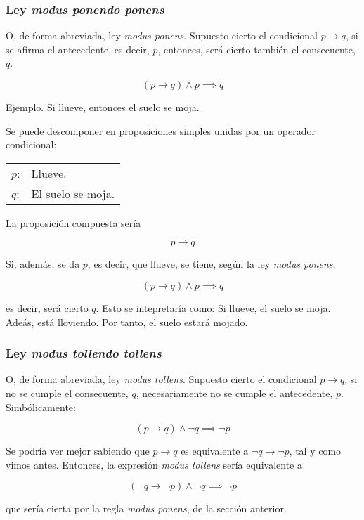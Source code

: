 \subsubsection{Ley \emph{modus ponendo ponens}}

O, de forma abreviada, ley \emph{modus ponens}. Supuesto cierto el
condicional $p \to q$, si se afirma el antecedente, es decir, $p$, entonces,
será cierto también el consecuente, $q$.

$$ (p \to q) \land p \implies q $$

Ejemplo. Si llueve, entonces el suelo se moja.

Se puede descomponer en proposiciones simples unidas por un operador
condicional:

\begin{tabular}{ll}
  $p$: & Llueve. \\
  $q$: & El suelo se moja. \\
\end{tabular}

La proposición compuesta sería

$$ p \to q $$

Si, además, se da $p$, es decir, que llueve, se tiene, según la ley
\emph{modus ponens},

$$ (p \to q) \land p \implies q $$

\noindent es decir, será cierto $q$. Esto se intepretaría como: Si llueve,
el suelo se moja. Adeás, está lloviendo. Por tanto, el suelo estará mojado.





\subsubsection{Ley \emph{modus tollendo tollens}}

O, de forma abreviada, ley \emph{modus tollens}. Supuesto cierto el
condicional $p \to q$, si no se cumple el consecuente, $q$, necesariamente
no se cumple el antecedente, $p$. Simbólicamente:

$$ (p \to q) \land \neg q \implies \neg p $$

Se podría ver mejor sabiendo que $p \to q$ es equivalente a $\neg q \to \neg
p$, tal y como vimos antes. Entonces, la expresión \emph{modus tollens}
sería equivalente a

$$ (\neg q \to \neg p) \land \neg q \implies \neg p $$

\noindent que sería cierta por la regla \emph{modus ponens}, de la sección
anterior.


